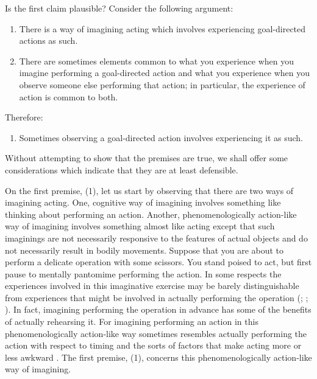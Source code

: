 \documentclass[12pt,\papersize]{extarticle}
\begin{document}
Is the first claim plausible?  Consider the following argument:
%
\begin{enumerate}
\item
There is a way of imagining acting which involves experiencing goal-directed actions as such.

\item
There are sometimes elements common to what you experience when you imagine performing a goal-directed action and what you experience when you observe someone else performing that action; in particular, the experience of action is common to both.
\end{enumerate}
Therefore:
\begin{enumerate}[resume]
\item
Sometimes observing a goal-directed action involves experiencing it as such.
\end{enumerate}
%
Without attempting to show that the premises are true, we shall offer some considerations which indicate that they are at least defensible. 

On the first premise, (1), let us start by observing that there are two ways of imagining acting.  One, cognitive way of imagining involves something like thinking about performing an action.  Another, phenomenologically action-like way of imagining involves something almost like acting except that such imaginings are not necessarily responsive to the features of actual objects and do not necessarily result in bodily movements.  Suppose that you are about to perform a delicate operation with some scissors. You stand poised to act, but first pause to mentally pantomime performing the action. In some respects the experiences involved in this imaginative exercise may be barely distinguishable from experiences that might be involved in actually performing the operation (\citealp[p.\ 161]{currie:1997_mental}; \citealp[p.\ 727]{jeannerod:1995_mental}; \citealp[p.\ 638-9]{kosslyn:2001_neural}).  In fact, imagining performing the operation in advance has some of the benefits of actually rehearsing it.  For imagining performing an action in this phenomenologically action-like way sometimes resembles actually performing the action with respect to timing \citep{decety:1989_timing, decety:1996_imagined, Jeannerod:1994oz} and the sorts of factors that make acting more or less awkward \citep{parsons:1994_temporal, frak:2001_orientation}.  The first premise, (1), concerns this phenomenologically action-like way of imagining.  
\end{document}
